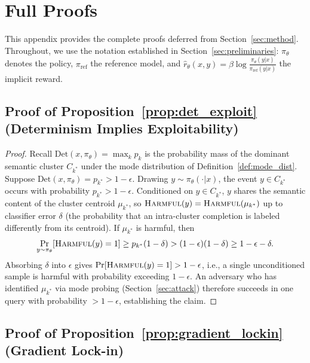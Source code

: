 \appendix

\section{Full Proofs}
\label{app:proofs}

This appendix provides the complete proofs deferred from Section~\ref{sec:method}. Throughout, we use the notation established in Section~\ref{sec:preliminaries}: $\pi_\theta$ denotes the policy, $\pi_{\text{ref}}$ the reference model, and $\hat{r}_\theta(x,y) = \beta \log \frac{\pi_\theta(y|x)}{\pi_{\text{ref}}(y|x)}$ the implicit reward.

\subsection{Proof of Proposition~\ref{prop:det_exploit} (Determinism Implies Exploitability)}

\begin{proof}
Recall $\text{Det}(x,\pi_\theta) = \max_k p_k$ is the probability mass of the dominant semantic cluster $C_{k^*}$ under the mode distribution of Definition~\ref{def:mode_dist}. Suppose $\text{Det}(x,\pi_\theta) = p_{k^*} > 1-\epsilon$. Drawing $y \sim \pi_\theta(\cdot|x)$, the event $y \in C_{k^*}$ occurs with probability $p_{k^*} > 1-\epsilon$. Conditioned on $y \in C_{k^*}$, $y$ shares the semantic content of the cluster centroid $\mu_{k^*}$, so $\textsc{Harmful}(y) = \textsc{Harmful}(\mu_{k^*})$ up to classifier error $\delta$ (the probability that an intra-cluster completion is labeled differently from its centroid). If $\mu_{k^*}$ is harmful, then
\[
\Pr_{y\sim\pi_\theta}[\textsc{Harmful}(y)=1] \geq p_{k^*}(1-\delta) > (1-\epsilon)(1-\delta) \geq 1-\epsilon-\delta.
\]
Absorbing $\delta$ into $\epsilon$ gives $\Pr[\textsc{Harmful}(y)=1] > 1-\epsilon$, i.e., a single unconditioned sample is harmful with probability exceeding $1-\epsilon$. An adversary who has identified $\mu_{k^*}$ via mode probing (Section~\ref{sec:attack}) therefore succeeds in one query with probability $>1-\epsilon$, establishing the claim.
\end{proof}

\subsection{Proof of Proposition~\ref{prop:gradient_lockin} (Gradient Lock-in)}

